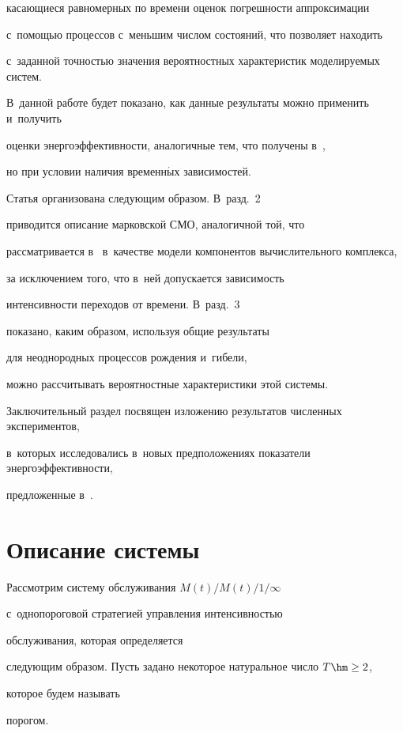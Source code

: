касающиеся равномерных по времени оценок погрешности аппроксимации

с~по\-мощью процессов с~меньшим числом состояний, что позволяет находить

с~заданной точностью значения вероятностных характеристик моделируемых систем.

В~данной работе будет показано, как данные результаты можно применить и~получить

оценки энергоэффективности, аналогичные тем, что получены в~\cite{a2},

но при условии наличия временн$\acute{\mbox{ы}}$х зависимостей.



Статья организована следующим образом. В~разд.~2

приводится описание марковской СМО, аналогичной той, что

рассматривается в~\cite{a2} в~качестве модели компонентов вычислительного комплекса,

за исключением того, что в~ней допускается зависимость

интенсивности переходов от времени. В~разд.~3

показано, каким образом, используя общие результаты

для неоднородных процессов рождения и~гибели,

можно рассчитывать вероятностные характеристики этой системы.

Заключительный раздел посвящен изложению результатов численных экспериментов, 

в~которых исследовались в~новых предположениях показатели энергоэффективности, 

предложенные в~\cite{a2}.



\section{Описание системы}



Рассмотрим систему обслуживания $M(t)/M(t)/1/\infty$ 

с~однопороговой стратегией управления интенсивностью

обслуживания, которая определяется

следующим образом. Пусть задано некоторое натуральное число $T\hm\ge 2$, 

которое будем называть

порогом.

